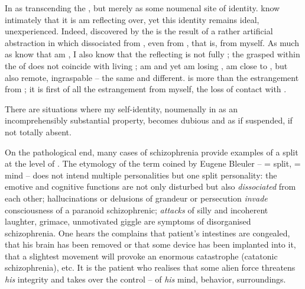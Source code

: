 
In     as transcending the
, but merely as some noumenal site of identity.  know
intimately that it is   am reflecting over, yet this identity
remains ideal, unexperienced.  Indeed,  discovered by the
 is the result of a rather artificial abstraction in
which  dissociated  from , even from
, that is, from myself.  As much as  know that  am , I
also know that the reflecting  is not fully ; the 
grasped within the  of  does not coincide with
 living ;  am  and yet  am losing
,  am close to , but also remote, ingraspable -- the
same and different.  is more than the estrangement from ; it is first of all the estrangement from myself, the loss of contact
with .

\pa  There are situations where
my self-identity,  noumenally in  as an incomprehensibly
substantial property, becomes dubious and as if suspended, if not totally absent.

On the pathological end, many cases of schizophrenia provide examples of a split
at the level of . The etymology of the term
coined by Eugene Bleuler --  = split,  = mind -- does not
intend multiple personalities but one split personality: the emotive and
cognitive functions are not only disturbed but also {\em dissociated} from each
other; hallucinations or delusions of grandeur or persecution {\em invade}
consciousness of a paranoid schizophrenic; {\em attacks} of silly and incoherent
laughter, grimace, unmotivated giggle are symptoms of disorganised
schizophrenia.  One hears the complains that patient's intestines are
congealed, that his brain has been removed or that some device has been
implanted into it, that a slightest movement will provoke an enormous
catastrophe (catatonic schizophrenia), etc.
It is the  patient who realises that some alien force threatens {\em his} integrity
and takes over the control -- of {\em his} mind, behavior, surroundings. 

